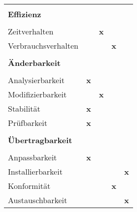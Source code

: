 \begin{table}[H]
\begin{tabular}{|lcccc|}
\rowcolor[RGB]{230,230,230}\hline &&&& \\[-0.4cm]
\rowcolor[RGB]{230,230,230}\textbf{Effizienz}    &&&&								         		  \\[0.1cm] 
\hline &&&& \\[-0.4cm]
Zeitverhalten         &          & \textbf{x}   &        &                \\[0.1cm]
Verbrauchsverhalten   &          &     & \textbf{x}      &                \\[0.1cm] 
\rowcolor[RGB]{230,230,230}\hline &&&& \\[-0.35cm]
\rowcolor[RGB]{230,230,230}\textbf{Änderbarkeit} &&&&						                 		  \\[0.1cm] 
\hline &&&& \\[-0.4cm]
Analysierbarkeit      & \textbf{x}        &     &        &                \\[0.1cm]
Modifizierbarkeit     &          & \textbf{x}   &        &                \\[0.1cm]
Stabilität            & \textbf{x}        &     &        &                \\[0.1cm]
Prüfbarkeit           & \textbf{x}        &     &        &                \\[0.1cm] 
\rowcolor[RGB]{230,230,230}\hline &&&& \\[-0.35cm]
\rowcolor[RGB]{230,230,230}\textbf{Übertragbarkeit} &&&&							         		  \\[0.1cm] 
\hline &&&& \\[-0.4cm]
Anpassbarkeit         & \textbf{x}        &     &        &                \\[0.1cm]
Installierbarkeit     &          &     &        & \textbf{x}              \\[0.1cm]
Konformität           &          &     & \textbf{x}      &                \\[0.1cm]
Austauschbarkeit      &          &     &        & \textbf{x}              \\ \hline
\end{tabular}
\end{table}
